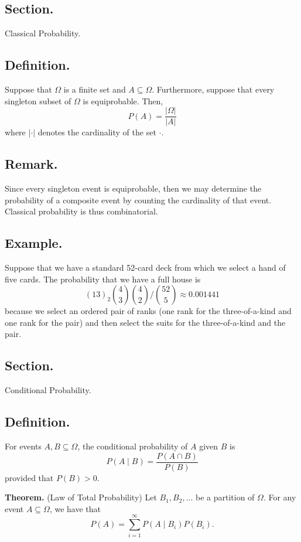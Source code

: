 \documentclass[titlepage]{article}
\begin{document}
\subsection{Section.} Classical Probability.

\subsection{Definition.} Suppose that $\Omega$ is a finite set and $A \subseteq \Omega$. Furthermore, suppose that every singleton subset of $\Omega$ is equiprobable. Then, 
$$P(A) = \frac{|\Omega|}{|A|}$$
where $|\cdot|$ denotes the cardinality of the set $\cdot$.

\subsection{Remark.} Since every singleton event is equiprobable, then we may determine the probability of a composite event by counting the cardinality of that event. Classical probability is thus combinatorial.

\subsection{Example.} Suppose that we have a standard 52-card deck from which we select a hand of five cards. The probability that we have a full house is 
$$(13)_{2}\binom{4}{3}\binom{4}{2} / \binom{52}{5} \approx 0.001441$$
because we select an ordered pair of ranks (one rank for the three-of-a-kind and one rank for the pair) and then select the suits for the three-of-a-kind and the pair.

\newpage {}

\subsection{Section.} Conditional Probability.

\subsection{Definition.} For events $A, B \subseteq \Omega$, the conditional probability of $A$ given $B$ is 
$$P(A \mid B) = \frac{P(A \cap B)}{P(B)}$$
provided that $P(B) > 0$.

\textbf{Theorem.} (Law of Total Probability) Let $B_{1}, B_{2}, \ldots$ be a partition of $\Omega$. For any event $A \subseteq \Omega$, we have that 
$$P(A) = \sum_{i=1}^{\infty}P(A \mid B_{i})P(B_{i}).$$
\end{document}
